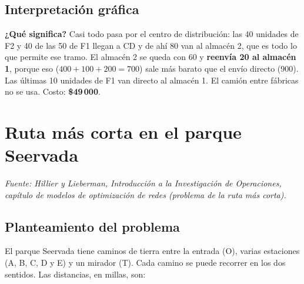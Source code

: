 \documentclass[11pt,a4paper]{article}
\begin{document}
\subsection*{Interpretación gráfica}
\noindent
\begin{minipage}[c]{0.47\textwidth}\centering
{}
\end{minipage}\hfill
\begin{minipage}[c]{0.50\textwidth}
\textbf{¿Qué significa?} Casi todo pasa por el centro de distribución: las 40 unidades de F2 y 40 de las 50 de F1
llegan a CD y de ahí 80 van al almacén 2, que es todo lo que permite ese tramo. El almacén 2 se queda con 60 y
\textbf{reenvía 20 al almacén 1}, porque eso ($400 + 100 + 200 = 700$) sale más barato que el envío directo (900). Las
últimas 10 unidades de F1 van directo al almacén 1. El camión entre fábricas no se usa. Costo: \textbf{\$49\,000}.
\end{minipage}

\section{Ruta más corta en el parque Seervada}
\textit{Fuente: Hillier y Lieberman, Introducción a la Investigación de Operaciones, capítulo de modelos de optimización
de redes (problema de la ruta más corta).}

\subsection*{Planteamiento del problema}
El parque Seervada tiene caminos de tierra entre la entrada (O), varias estaciones (A, B, C, D y E) y un mirador (T).
Cada camino se puede recorrer en los dos sentidos. Las distancias, en millas, son:
\end{document}
